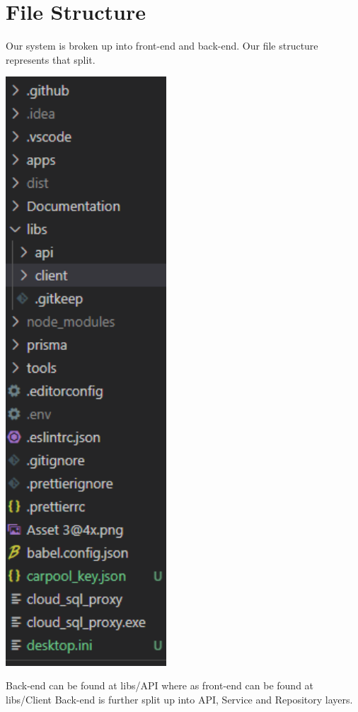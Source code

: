 \documentclass[hidelinks, 12pt, a4paper]{article}
\begin{document}
\section{File Structure}
Our system is broken up into front-end and back-end. Our file structure represents that split.
\begin{center}
    \includegraphics[width=6cm]{images/File Structure 1.png} \\
\end{center}
\vspace{0.5cm} 
Back-end can be found at libs/API where as front-end can be found at libs/Client 
\newpage Back-end is further split up into API, Service and Repository layers.
\end{document}
